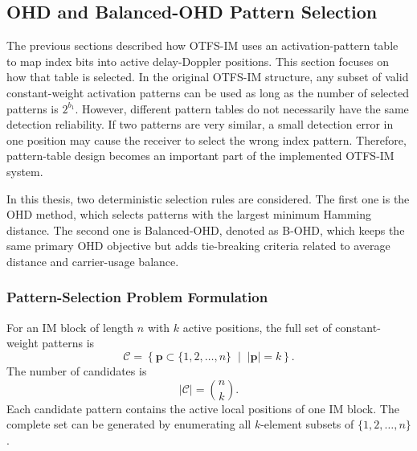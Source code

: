 \subsection{OHD and Balanced-OHD Pattern Selection}

The previous sections described how OTFS-IM uses an activation-pattern table to map index bits into active delay-Doppler positions. This section focuses on how that table is selected. In the original OTFS-IM structure, any subset of valid constant-weight activation patterns can be used as long as the number of selected patterns is \(2^{b_1}\). However, different pattern tables do not necessarily have the same detection reliability. If two patterns are very similar, a small detection error in one position may cause the receiver to select the wrong index pattern. Therefore, pattern-table design becomes an important part of the implemented OTFS-IM system.

In this thesis, two deterministic selection rules are considered. The first one is the OHD method, which selects patterns with the largest minimum Hamming distance. The second one is Balanced-OHD, denoted as B-OHD, which keeps the same primary OHD objective but adds tie-breaking criteria related to average distance and carrier-usage balance.

\subsubsection{Pattern-Selection Problem Formulation}

For an IM block of length \(n\) with \(k\) active positions, the full set of constant-weight patterns is
\begin{equation}
    \mathcal{C}
    =
    \left\{
    \mathbf{p} \subset \{1,2,\ldots,n\}
    \; \middle| \;
    |\mathbf{p}| = k
    \right\}.
    \label{eq:full_pattern_candidate_set}
\end{equation}
The number of candidates is
\begin{equation}
    |\mathcal{C}|
    =
    \binom{n}{k}.
    \label{eq:number_of_candidate_patterns}
\end{equation}
Each candidate pattern contains the active local positions of one IM block. The complete set can be generated by enumerating all \(k\)-element subsets of \(\{1,2,\ldots,n\}\).

